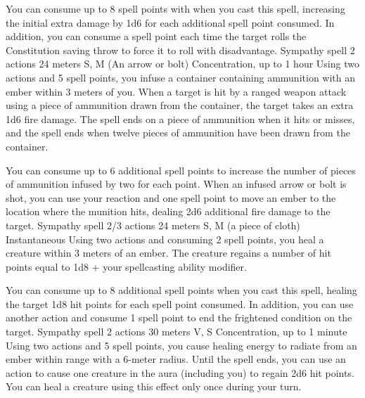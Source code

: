         You can consume up to 8 spell points with when you cast this spell, increasing the initial extra damage by 1d6 for each additional spell point consumed.
        In addition, you can consume a spell point each time the target rolls the Constitution saving throw to force it to roll with disadvantage.
        {Sympathy spell}
        {2 actions}
        {24 meters}
        {S, M (An arrow or bolt)}
        {Concentration, up to 1 hour}
        Using two actions and 5 spell points, you infuse a container containing ammunition with an ember within 3 meters of you.
        When a target is hit by a ranged weapon attack using a piece of ammunition drawn from the container, the target takes an extra 1d6 fire damage.
        The spell ends on a piece of ammunition when it hits or misses, and the spell ends when twelve pieces of ammunition have been drawn from the container.

        You can consume up to 6 additional spell points to increase the number of pieces of ammunition infused by two for each point.
        When an infused arrow or bolt is shot, you can use your reaction and one spell point to move an ember to the location where the munition hits, dealing 2d6 additional fire damage to the target.
        {Sympathy spell}
        {2/3 actions}
        {24 meters}
        {S, M (a piece of cloth)}
        {Instantaneous}
        Using two actions and consuming 2 spell points, you heal a creature within 3 meters of an ember.
        The creature regains a number of hit points equal to 1d8 + your spellcasting ability modifier.

        You can consume up to 8 additional spell points when you cast this spell, healing the target 1d8 hit points for each spell point consumed.
        In addition, you can use another action and consume 1 spell point to end the frightened condition on the target.
        {Sympathy spell}
        {2 actions}
        {30 meters}
        {V, S}
        {Concentration, up to 1 minute}
        Using two actions and 5 spell points, you cause healing energy to radiate from an ember within range with a 6-meter radius.
        Until the spell ends, you can use an action to cause one creature in the aura (including you) to regain 2d6 hit points.
        You can heal a creature using this effect only once during your turn.

